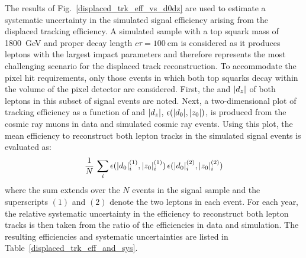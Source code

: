 The results of Fig.~\ref{displaced_trk_eff_vs_d0dz} are used to estimate a systematic uncertainty in the simulated signal efficiency arising from the displaced tracking efficiency. A simulated \stoptolb sample with a top squark mass of \SI{1800}{\GeV} and proper decay length $c\tau = \SI{100}{\cm}$ is considered as it produces leptons with the largest impact parameters and therefore represents the most challenging scenario for the displaced track reconstruction. To accommodate the pixel hit requirements, only those events in which both top squarks decay within the volume of the pixel detector are considered. First, the \ad and $\lvert d_z \rvert$ of both leptons in this subset of signal events are noted. Next, a two-dimensional plot of tracking efficiency as a function of \ad and $\lvert d_z \rvert$, $\epsilon(\lvert d_0 \rvert, \lvert z_0 \rvert)$, is produced from the cosmic ray muons in data and simulated cosmic ray events. Using this plot, the mean efficiency to reconstruct both lepton tracks in the simulated signal events is evaluated as:
\begin{equation}
    \frac{1}{N}\,\sum_i\epsilon(\lvert d_0 \rvert^{(1)}_i, \lvert z_0 \rvert^{(1)}_i)\, \epsilon(\lvert d_0 \rvert^{(2)}_i, \lvert z_0 \rvert^{(2)}_i)
\end{equation}
where the sum extends over the $N$ events in the signal sample and the superscripts
$(1)$ and $(2)$ denote the two leptons in each event. For each year, the relative systematic uncertainty in the efficiency to reconstruct both lepton tracks is then taken from the ratio of the efficiencies in data and simulation. The resulting efficiencies and systematic uncertainties are listed in Table~\ref{displaced_trk_eff_and_sys}.

